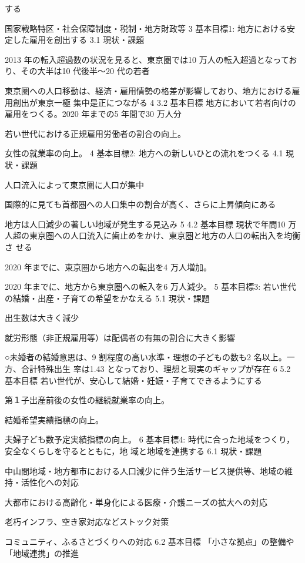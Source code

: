 する
\item 国家戦略特区・社会保障制度・税制・地方財政等
3 基本目標1: 地方における安定した雇用を創出する
3.1 現状・課題
\item 2013 年の転入超過数の状況を見ると、東京圏では10 万人の転入超過となっており、その大半は10
代後半～20 代の若者
\item 東京圏への人口移動は、経済・雇用情勢の格差が影響しており、地方における雇用創出が東京一極
集中是正につながる
4
3.2 基本目標
地方において若者向けの雇用をつくる。2020 年までの5 年間で30 万人分
\item 若い世代における正規雇用労働者の割合の向上。
\item 女性の就業率の向上。
4 基本目標2: 地方への新しいひとの流れをつくる
4.1 現状・課題
\item 人口流入によって東京圏に人口が集中
\item 国際的に見ても首都圏への人口集中の割合が高く、さらに上昇傾向にある
\item 地方は人口減少の著しい地域が発生する見込み
5
4.2 基本目標
現状で年間10 万人超の東京圏への人口流入に歯止めをかけ、東京圏と地方の人口の転出入を均衡さ
せる
\item 2020 年までに、東京圏から地方への転出を4 万人増加。
\item 2020 年までに、地方から東京圏への転入を6 万人減少。
5 基本目標3: 若い世代の結婚・出産・子育ての希望をかなえる
5.1 現状・課題
\item 出生数は大きく減少　
\item 就労形態（非正規雇用等）は配偶者の有無の割合に大きく影響
\item ○未婚者の結婚意思は、9 割程度の高い水準・理想の子どもの数も2 名以上。一方、合計特殊出生
率は1.43 となっており、理想と現実のギャップが存在
6
5.2 基本目標
若い世代が、安心して結婚・妊娠・子育てできるようにする
\item 第１子出産前後の女性の継続就業率の向上。
\item 結婚希望実績指標の向上。
\item 夫婦子ども数予定実績指標の向上。
6 基本目標4: 時代に合った地域をつくり，安全なくらしを守るとともに，地
域と地域を連携する
6.1 現状・課題
\item 中山間地域・地方都市における人口減少に伴う生活サービス提供等、地域の維持・活性化への対応
\item 大都市における高齢化・単身化による医療・介護ニーズの拡大への対応
\item 老朽インフラ、空き家対応などストック対策
\item コミュニティ、ふるさとづくりへの対応
6.2 基本目標
「小さな拠点」の整備や「地域連携」の推進
